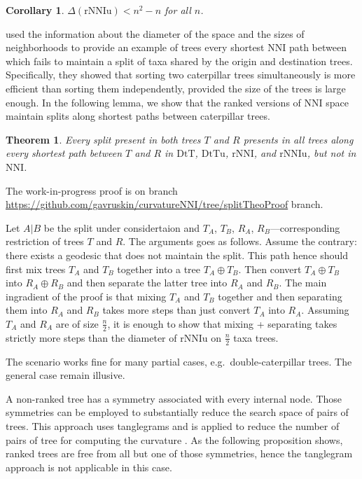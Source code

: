 \documentclass{amsart}
\newtheorem{corollary}[lemma]{Corollary}
\newtheorem{theorem}[lemma]{Theorem}
\theoremstyle{definition}
\newcommand{\nni}{\mathrm{NNI}}
\newcommand{\rnni}{\mathrm{rNNI}}
\newcommand{\rnniu}{\mathrm{rNNIu}}
\newcommand{\dtt}{\mathrm{DtT}}
\newcommand{\dttu}{\mathrm{DtTu}}
\begin{document}
\begin{corollary}\label{diameterUpperBoundCoro}
$\Delta(\rnniu) < n^2 - n$ for all $n$.
\end{corollary}

\textcite{li1996some} used the information about the diameter of the space and the sizes of neighborhoods to provide an example of trees every shortest $\nni$ path between which fails to maintain a split of taxa shared by the origin and destination trees.
Specifically, they showed that sorting two caterpillar trees simultaneously is more efficient than sorting them independently, provided the size of the trees is large enough.
In the following lemma, we show that the ranked versions of $\nni$ space maintain splits along shortest paths between caterpillar trees.

\begin{theorem}\label{splitTheo}
 Every split present in both trees $T$ and $R$ presents in all trees along every shortest path between $T$ and $R$ in $\dtt$, $\dttu$, $\rnni$, and $\rnniu$, but not in $\nni$.
 \end{theorem}

\proof
The work-in-progress proof is on branch
\url{https://github.com/gavruskin/curvatureNNI/tree/splitTheoProof} branch.

Let $A|B$ be the split under considertaion and $T_A$, $T_B$, $R_A$, $R_B$---corresponding restriction of trees $T$ and $R$.
The arguments goes as follows.
Assume the contrary: there exists a geodesic that does not maintain the split.
This path hence should first mix trees $T_A$ and $T_B$ together into a tree $T_A \oplus T_B$.
Then convert $T_A \oplus T_B$ into $R_A \oplus R_B$ and then separate the latter tree into $R_A$ and $R_B$.
The main ingradient of the proof is that mixing $T_A$ and $T_B$ together and then separating them into $R_A$ and $R_B$ takes more steps than just convert $T_A$ into $R_A$.
Assuming $T_A$ and $R_A$ are of size $\frac n2$, it is enough to show that mixing + separating takes strictly more steps than the diameter of $\rnniu$ on $\frac n2$ taxa trees.

The scenario works fine for many partial cases, e.g.\ double-caterpillar trees.
The general case remain illusive.
\endproof

A non-ranked tree has a symmetry associated with every internal node.
Those symmetries can be employed to substantially reduce the search space of pairs of trees.
This approach uses tanglegrams \autocite{Matsen2015-fn} and is applied to reduce the number of pairs of tree for computing the curvature \autocite{Whidden2015-es}.
As the following proposition shows, ranked trees are free from all but one of those symmetries, hence the tanglegram approach is not applicable in this case.
\end{document}
